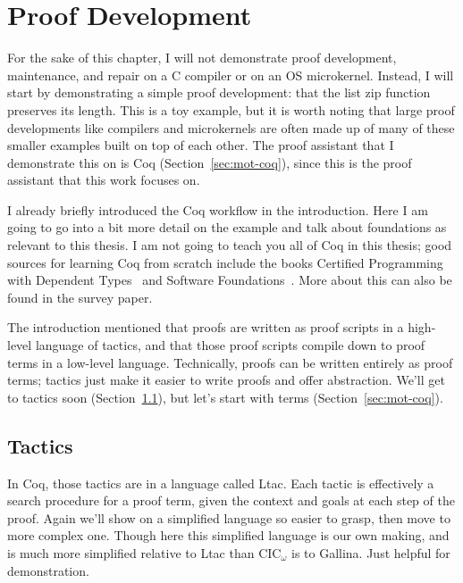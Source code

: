 \section{Proof Development}
\label{sec:mot-dev}


For the sake of this chapter, I will not demonstrate proof development, maintenance, and repair on a C compiler or on an OS microkernel.
Instead, I will start by demonstrating a simple proof development: 
that the list zip function preserves its length.
This is a toy example, but it is worth noting that large proof developments like compilers and microkernels
are often made up of many of these smaller examples built on top of each other.	
The proof assistant that I demonstrate this on is Coq (Section~\ref{sec:mot-coq}), since this is the proof assistant that this work focuses on.

I already briefly introduced the Coq workflow in the introduction.
Here I am going to go into a bit more detail on the example and talk about foundations as relevant to this thesis.
I am not going to teach you all of Coq in this thesis;
good sources for learning Coq from scratch include the books Certified Programming with Dependent Types~\cite{chlipala:cpdt}
and Software Foundations~\cite{software-foundations}.
More about this can also be found in the survey paper.

The introduction mentioned that proofs are written as proof scripts in a high-level language of tactics,
and that those proof scripts compile down to proof terms in a low-level language.
Technically, proofs can be written entirely as proof terms; tactics just make it easier to write proofs and offer abstraction.
We'll get to tactics soon (Section~\ref{sec:tactics}), but let's start with terms (Section~\ref{sec:mot-coq}).



\subsection{Tactics}
\label{sec:tactics}

In Coq, those tactics are in a language called Ltac.
Each tactic is effectively a search procedure for a proof term, given the context and goals at each step of the proof.
Again we'll show on a simplified language so easier to grasp, then move to more complex one.
Though here this simplified language is our own making, and is much more simplified relative to Ltac than CIC$_{\omega}$
is to Gallina. Just helpful for demonstration.

